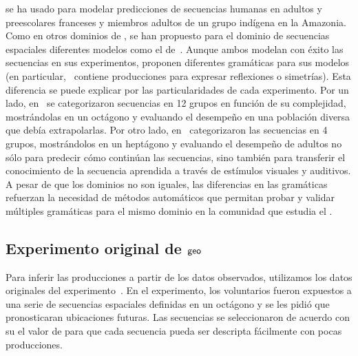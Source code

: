 \gramgeo se ha usado para modelar predicciones de secuencias humanas en adultos y preescolares franceses y miembros adultos de un grupo indígena en la Amazonia. Como en otros dominios de \lot, se han propuesto para el dominio de secuencias espaciales diferentes modelos como el de~\cite{yildirim2015learning}. Aunque ambos modelan con éxito las secuencias en sus experimentos, proponen diferentes gramáticas para sus modelos (en particular,~\cite{amalric2017language} contiene producciones para expresar reflexiones o simetrías). Esta diferencia se puede explicar por las particularidades de cada experimento. Por un lado, en~\cite{amalric2017language} se categorizaron secuencias en 12 grupos en función de su complejidad, mostrándolas en un octágono y evaluando el desempeño en una población diversa que debía extrapolarlas. Por otro lado, en~\cite{yildirim2015learning} categorizaron las secuencias en 4 grupos, mostrándolos en un heptágono y evaluando el desempeño de adultos no sólo para predecir cómo continúan las secuencias, sino también para transferir el conocimiento de la secuencia aprendida a través de estímulos visuales y auditivos. A pesar de que los dominios no son iguales, las diferencias en las gramáticas refuerzan la necesidad de métodos automáticos que permitan probar y validar múltiples gramáticas para el mismo dominio en la comunidad que estudia el \lot.


\subsection{Experimento original de ${\sf geo}$}


Para inferir las producciones a partir de los datos observados, utilizamos los datos originales del experimento~\cite{amalric2017language}. En el experimento, los voluntarios fueron expuestos a una serie de secuencias espaciales definidas en un octágono y se les pidió que pronosticaran ubicaciones futuras. Las secuencias se seleccionaron de acuerdo con su el valor de \mdlgeo para que cada secuencia pueda ser descripta fácilmente con pocas producciones.


